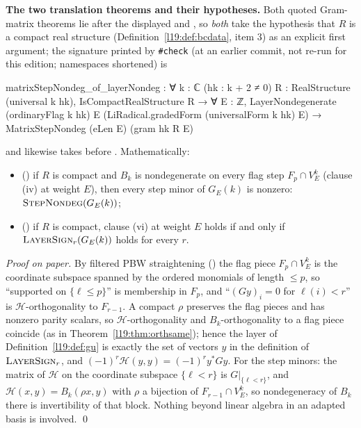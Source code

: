 \textbf{The two translation theorems and their hypotheses.} Both quoted Gram-matrix theorems lie after the
displayed  and , so \emph{both} take the hypothesis
that $R$ is a compact real structure (Definition~\ref{l19:def:bcdata}, item 3) as an explicit first argument; the
signature printed by \texttt{\#check} (at an earlier commit, not re-run for this edition; namespaces shortened) is
\begin{plaincode}
matrixStepNondeg_of_layerNondeg : ∀ {k : ℂ} (hk : k + 2 ≠ 0) {R : RealStructure (universal k hk)},
  IsCompactRealStructure R → ∀ {E : ℤ},
    LayerNondegenerate (ordinaryFlag k hk) E (LiRadical.gradedForm (universalForm k hk) E) →
      MatrixStepNondeg (eLen E) (gram hk R E)
\end{plaincode}
and likewise  takes  before . Mathematically:
\begin{itemize}
\item () if $R$ is compact and $B_k$ is nondegenerate on every flag step
  $F_p\cap V^k_E$ (clause (iv) at weight $E$), then every step minor of $G_E(k)$ is nonzero:
  $\textsc{StepNondeg}(G_E(k))$;
\item () if $R$ is compact, clause (vi) at weight $E$ holds if and only if
  $\textsc{LayerSign}_r(G_E(k))$ holds for every $r$.
\end{itemize}
\emph{Proof on paper.} By filtered PBW straightening () the flag piece $F_p\cap V^k_E$
is the coordinate subspace spanned by the ordered monomials of length $\le p$, so ``supported on $\{\ell\le p\}$'' is
membership in $F_p$, and ``$(Gy)_i = 0$ for $\ell(i)<r$'' is $\mathcal H$-orthogonality to $F_{r-1}$. A compact $\rho$
preserves the flag pieces and has nonzero parity scalars, so $\mathcal H$-orthogonality and $B_k$-orthogonality to a flag
piece coincide (as in Theorem~\ref{l19:thm:orthsame}); hence the layer of Definition~\ref{l19:def:gu} is exactly the
set of vectors $y$ in the definition of $\textsc{LayerSign}_r$, and $(-1)^r \mathcal H(y,y) = (-1)^r y^*G y$. For the step
minors: the matrix of $\mathcal H$ on the coordinate subspace $\{\ell<r\}$ is $G|_{\{\ell<r\}}$, and $\mathcal H(x,y) = B_k(\rho x,y)$
with $\rho$ a bijection of $F_{r-1}\cap V^k_E$, so nondegeneracy of $B_k$ there is invertibility of that block.
Nothing beyond linear algebra in an adapted basis is involved. \qed

